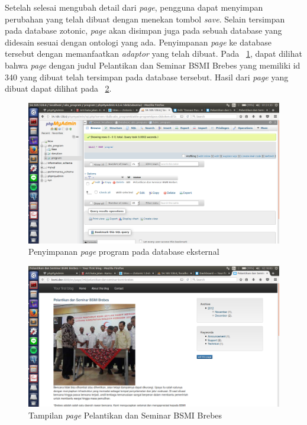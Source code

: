 Setelah selesai mengubah detail dari \textit{page}, pengguna dapat menyimpan perubahan yang telah dibuat dengan menekan tombol \textit{save}. Selain tersimpan pada database zotonic, \textit{page} akan disimpan juga pada sebuah database yang didesain sesuai dengan ontologi yang ada. Penyimpanan \textit{page} ke database tersebut dengan memanfaatkan \textit{adaptor} yang telah dibuat. Pada \pic~\ref{fig:saveprogram}, dapat dilihat bahwa \textit{page} dengan judul Pelantikan dan Seminar BSMI Brebes yang memiliki id 340 yang dibuat telah tersimpan pada database tersebut. Hasil dari \textit{page} yang dibuat dapat dilihat pada \pic~\ref{fig:viewprogram}.
\begin{figure}
	\centering
	\includegraphics[width=1\textwidth]
	{pics/5-saveProgram.png}
	\caption{Penyimpanan \textit{page} program pada database eksternal}
	\label{fig:saveprogram}
\end{figure}
\vspace{-0.3cm}

\begin{figure}
	\centering
	\includegraphics[width=1\textwidth]
	{pics/5-viewProgram.png}
	\caption{Tampilan \textit{page} Pelantikan dan Seminar BSMI Brebes}
	\label{fig:viewprogram}
\end{figure}
\vspace{-0.3cm}

